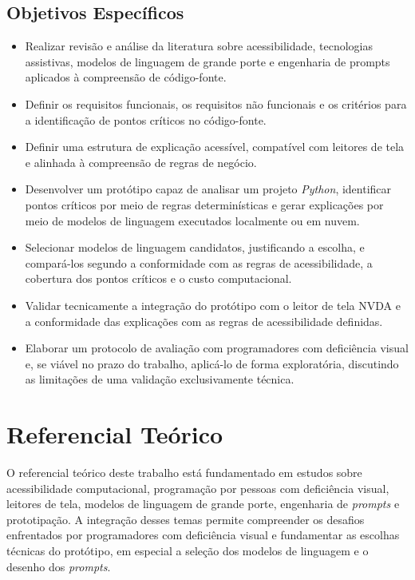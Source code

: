 \documentclass[
    12pt,                   %
    openright,              %
    oneside,                %
    a4paper,                %
    sumario=tradicional,    %
    english,                %
    brazil,                 %
    ]{abntex2}
\begin{document}
\section{Objetivos Específicos}

\begin{itemize}
  \item Realizar revisão e análise da literatura sobre acessibilidade, tecnologias assistivas, modelos de linguagem de grande porte e engenharia de prompts aplicados à compreensão de código-fonte.
  \item Definir os requisitos funcionais, os requisitos não funcionais e os critérios para a identificação de pontos críticos no código-fonte.
  \item Definir uma estrutura de explicação acessível, compatível com leitores de tela e alinhada à compreensão de regras de negócio.
  \item Desenvolver um protótipo capaz de analisar um projeto \textit{Python}, identificar pontos críticos por meio de regras determinísticas e gerar explicações por meio de modelos de linguagem executados localmente ou em nuvem.
  \item Selecionar modelos de linguagem candidatos, justificando a escolha, e compará-los segundo a conformidade com as regras de acessibilidade, a cobertura dos pontos críticos e o custo computacional.
  \item Validar tecnicamente a integração do protótipo com o leitor de tela NVDA e a conformidade das explicações com as regras de acessibilidade definidas.
  \item Elaborar um protocolo de avaliação com programadores com deficiência visual e, se viável no prazo do trabalho, aplicá-lo de forma exploratória, discutindo as limitações de uma validação exclusivamente técnica.
\end{itemize}


\chapter{Referencial Teórico}\label{sec:refteorico}

O referencial teórico deste trabalho está fundamentado em estudos sobre acessibilidade computacional, programação por pessoas com deficiência visual, leitores de tela, modelos de linguagem de grande porte, engenharia de \textit{prompts} e prototipação. A integração desses temas permite compreender os desafios enfrentados por programadores com deficiência visual e fundamentar as escolhas técnicas do protótipo, em especial a seleção dos modelos de linguagem e o desenho dos \textit{prompts}.
\end{document}
